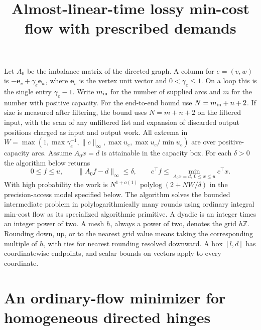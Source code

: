 \documentclass[11pt]{article}
\title{Almost-linear-time lossy min-cost flow with prescribed demands}
\date{}
\begin{document}
\maketitle

Let \(A_0\) be the imbalance matrix of the directed graph. A column for \(e=(v,w)\) is \(-\mathbf e_v+\gamma_e\mathbf e_w\), where \(\mathbf e_v\) is the vertex unit vector and \(0<\gamma_e\le1\). On a loop this is the single entry \(\gamma_e-1\). Write \(m_{\rm in}\) for the number of supplied arcs and \(m\) for the number with positive capacity. For the end-to-end bound use \(N=m_{\rm in}+n+2\). If size is measured after filtering, the bound uses \(N=m+n+2\) on the filtered input, with the scan of any unfiltered list and expansion of discarded output positions charged as input and output work. All extrema in \(W=\max(1,\max\gamma_e^{-1},\|c\|_\infty,\max u_e,\max u_e/\min u_e)\) are over positive-capacity arcs. Assume \(A_0x=d\) is attainable in the capacity box. For each \(\delta>0\) the algorithm below returns
\[
 0\le f\le u,\qquad \|A_0 f-d\|_\infty\le\delta,\qquad
 c^\top f\le \min_{A_0 x=d,\ 0\le x\le u}c^\top x .
\]
With high probability the work is \(N^{1+o(1)}\operatorname{polylog}(2+NW/\delta)\) in the precision-access model specified below. The algorithm solves the bounded intermediate problem in polylogarithmically many rounds using ordinary integral min-cost flow as its specialized algorithmic primitive. A dyadic is an integer times an integer power of two. A mesh \(h\), always a power of two, denotes the grid \(h\mathbb Z\). Rounding down, up, or to the nearest grid value means taking the corresponding multiple of \(h\), with ties for nearest rounding resolved downward. A box \([l,d]\) has coordinatewise endpoints, and scalar bounds on vectors apply to every coordinate.

\hypertarget{an-ordinary-flow-minimizer-for-homogeneous-directed-hinges}{%
\section*{An ordinary-flow minimizer for homogeneous directed hinges}\label{an-ordinary-flow-minimizer-for-homogeneous-directed-hinges}}
\end{document}
